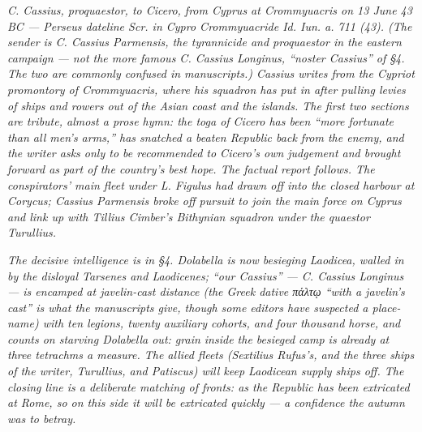 
\textit{C. Cassius, proquaestor, to Cicero, from Cyprus at Crommyuacris on
13 June 43 BC --- Perseus dateline \textit{Scr. in Cypro Crommyuacride Id. Iun.
a. 711 (43)}. (The sender is C. Cassius Parmensis, the tyrannicide and
proquaestor in the eastern campaign --- not the more famous C. Cassius Longinus,
``noster Cassius'' of \S 4. The two are commonly confused in manuscripts.)
Cassius writes from the Cypriot promontory of Crommyuacris, where his squadron
has put in after pulling levies of ships and rowers out of the Asian coast and
the islands. The first two sections are tribute, almost a prose hymn: the
\emph{toga} of Cicero has been ``more fortunate than all men's arms,'' has
snatched a beaten Republic back from the enemy, and the writer asks only to be
recommended to Cicero's own judgement and brought forward as part of the
country's best hope. The factual report follows. The conspirators' main fleet
under L. Figulus had drawn off into the closed harbour at Corycus; Cassius
Parmensis broke off pursuit to join the main force on Cyprus and link up with
Tillius Cimber's Bithynian squadron under the quaestor Turullius.}

\textit{The decisive intelligence is in \S 4. Dolabella is now besieging
Laodicea, walled in by the disloyal Tarsenes and Laodicenes; ``our Cassius'' ---
C. Cassius Longinus --- is encamped at javelin-cast distance (the Greek dative
\textgreek{πάλτῳ} ``with a javelin's cast'' is what the manuscripts give,
though some editors have suspected a place-name) with ten legions, twenty
auxiliary cohorts, and four thousand horse, and counts on starving Dolabella
out: grain inside the besieged camp is already at three tetrachms a measure. The
allied fleets (Sextilius Rufus's, and the three ships of the writer, Turullius,
and Patiscus) will keep Laodicean supply ships off. The closing line is a
deliberate matching of fronts: as the Republic has been extricated at Rome, so
on this side it will be extricated quickly --- a confidence the autumn was to
betray.}
